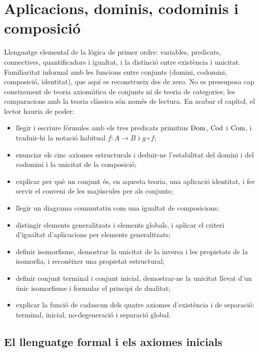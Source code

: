 \chapter{Aplicacions, dominis, codominis i composició}\label{cap:aplicacions}

\begin{objectius}
 Llenguatge elemental de la lògica de primer ordre: variables, predicats, connectives, quantificadors i igualtat, i la distinció entre existència i unicitat. Familiaritat informal amb les funcions entre conjunts (domini, codomini, composició, identitat), que aquí es reconstrueix des de zero. No es pressuposa cap coneixement de teoria axiomàtica de conjunts ni de teoria de categories; les comparacions amb la teoria clàssica són només de lectura.
 En acabar el capítol, el lector hauria de poder:
\begin{itemize}
  \item llegir i escriure fórmules amb els tres predicats primitius \(\operatorname{Dom}\), \(\operatorname{Cod}\) i \(\operatorname{Com}\), i traduir-hi la notació habitual \(f\colon A\to B\) i \(g\circ f\);
  \item enunciar els cinc axiomes estructurals i deduir-ne l'estabilitat del domini i del codomini i la unicitat de la composició;
  \item explicar per què un conjunt és, en aquesta teoria, una aplicació identitat, i fer servir el conveni de les majúscules per als conjunts;
  \item llegir un diagrama commutatiu com una igualtat de composicions;
  \item distingir elements generalitzats i elements globals, i aplicar el criteri d'igualtat d'aplicacions per elements generalitzats;
  \item definir isomorfisme, demostrar la unicitat de la inversa i les propietats de la isomorfia, i reconèixer una propietat estructural;
  \item definir conjunt terminal i conjunt inicial, demostrar-ne la unicitat llevat d'un únic isomorfisme i formular el principi de dualitat;
  \item explicar la funció de cadascun dels quatre axiomes d'existència i de separació: terminal, inicial, no-degeneració i separació global.
\end{itemize}
\end{objectius}

\section{El llenguatge formal i els axiomes inicials}

